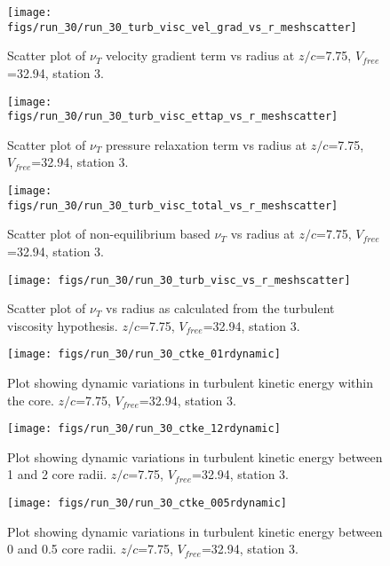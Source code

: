 \begin{figure}[H]
\centering
\texttt{[image: figs/run\_30/run\_30\_turb\_visc\_vel\_grad\_vs\_r\_meshscatter]}
\caption{Scatter plot of $\nu_T$ velocity gradient term vs radius at $z/c$=7.75, $V_{free}$=32.94, station 3.}
\end{figure}


\begin{figure}[H]
\centering
\texttt{[image: figs/run\_30/run\_30\_turb\_visc\_ettap\_vs\_r\_meshscatter]}
\caption{Scatter plot of $\nu_T$ pressure relaxation term vs radius at $z/c$=7.75, $V_{free}$=32.94, station 3.}
\end{figure}


\begin{figure}[H]
\centering
\texttt{[image: figs/run\_30/run\_30\_turb\_visc\_total\_vs\_r\_meshscatter]}
\caption{Scatter plot of non-equilibrium based $\nu_T$ vs radius at $z/c$=7.75, $V_{free}$=32.94, station 3.}
\end{figure}


\begin{figure}[H]
\centering
\texttt{[image: figs/run\_30/run\_30\_turb\_visc\_vs\_r\_meshscatter]}
\caption{Scatter plot of $\nu_T$ vs radius as calculated from the turbulent viscosity hypothesis. $z/c$=7.75, $V_{free}$=32.94, station 3.}
\end{figure}


\begin{figure}[H]
\centering
\texttt{[image: figs/run\_30/run\_30\_ctke\_01rdynamic]}
\caption{Plot showing dynamic variations in turbulent kinetic energy within the core. $z/c$=7.75, $V_{free}$=32.94, station 3.}
\end{figure}


\begin{figure}[H]
\centering
\texttt{[image: figs/run\_30/run\_30\_ctke\_12rdynamic]}
\caption{Plot showing dynamic variations in turbulent kinetic energy between 1 and 2 core radii. $z/c$=7.75, $V_{free}$=32.94, station 3.}
\end{figure}


\begin{figure}[H]
\centering
\texttt{[image: figs/run\_30/run\_30\_ctke\_005rdynamic]}
\caption{Plot showing dynamic variations in turbulent kinetic energy between 0 and 0.5 core radii. $z/c$=7.75, $V_{free}$=32.94, station 3.}
\end{figure}


